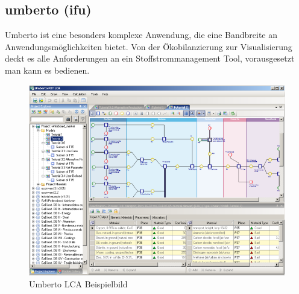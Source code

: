 \documentclass[a4paper, 12pt, twoside, BCOR=20mm, DIV=calc, abstracton, parskip=half*, toc=bibliography, toc=listof, headsepline, footsepline, headings=small, numbers=enddot]{scrreprt}
\begin{document}
%
%
\subsection{umberto (ifu)}
Umberto ist eine besonders komplexe Anwendung, die eine Bandbreite an Anwendungsmöglichkeiten bietet. Von der Ökobilanzierung zur Visualisierung deckt es alle Anforderungen an ein Stoffstrommanagement Tool, vorausgesetzt man kann es bedienen. 

\begin{figure}
\includegraphics[width=\textwidth]{Bild/Umberto NXT LCA.png}
\caption{Umberto LCA Beispielbild} 
 \end{figure}
\end{document}

